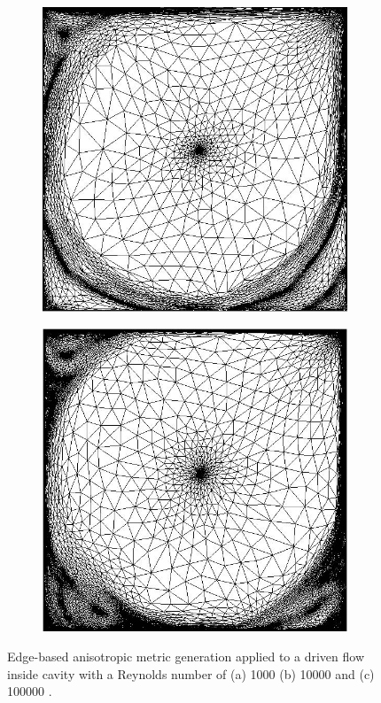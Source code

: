\begin{figure}[htbp]
\begin{subfigure}[t]{0.3\textwidth}
	\includegraphics[width=\textwidth]{Chapter2/Graphics/remesh4_10000.png}
	\caption{}
  \end{subfigure}
  \begin{subfigure}[t]{0.3\textwidth}
    \centering
	\includegraphics[width=\textwidth]{Chapter2/Graphics/remesh4_100000.png}
	\caption{}
  \end{subfigure}
\caption{Edge-based anisotropic metric generation applied to a driven flow inside cavity with a Reynolds number of 
(a) \num{1000} (b) \num{10000} and (c) \num{100000} \citep{coupez_edge-based_2013}. } 
\label{fig:remesh4}
\end{figure}

